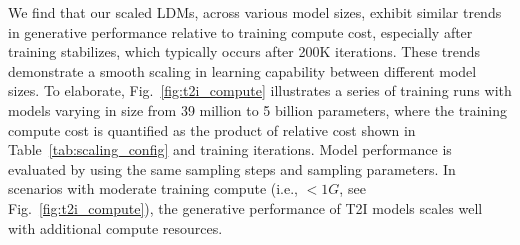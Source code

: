 


We find that our scaled LDMs, across various model sizes, exhibit similar trends in generative performance relative to training compute cost, especially after training stabilizes, which typically occurs after 200K iterations.
These trends demonstrate a smooth scaling in learning capability between different model sizes.
To elaborate, Fig.~\ref{fig:t2i_compute} illustrates a series of training runs with models varying in size from 39 million to 5 billion parameters, where the training compute cost is quantified as the product of relative cost shown in Table~\ref{tab:scaling_config} and training iterations.
Model performance is evaluated by using the same sampling steps and sampling parameters.
In scenarios with moderate training compute (i.e., $<1G$, see Fig.~\ref{fig:t2i_compute}), the generative performance of T2I models scales well with additional compute resources. 


